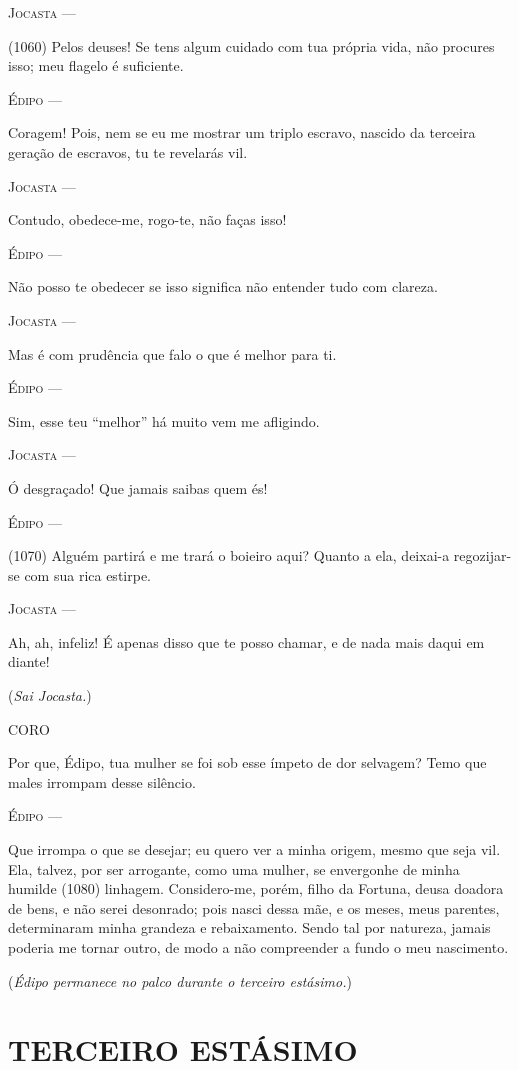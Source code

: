 \textsc{Jocasta} ---

(1060) Pelos deuses! Se tens algum cuidado com tua própria vida, não
procures isso; meu flagelo é suficiente.

\textsc{Édipo} ---

Coragem! Pois, nem se eu me mostrar um triplo escravo, nascido da
terceira geração de escravos, tu te revelarás vil.

\textsc{Jocasta} ---

Contudo, obedece-me, rogo-te, não faças isso!

\textsc{Édipo} ---

Não posso te obedecer se isso significa não entender tudo com clareza.

\textsc{Jocasta} ---

Mas é com prudência que falo o que é melhor para ti.

\textsc{Édipo} ---

Sim, esse teu ``melhor'' há muito vem me afligindo.

\textsc{Jocasta} ---

Ó desgraçado! Que jamais saibas quem és!

\textsc{Édipo} ---

(1070) Alguém partirá e me trará o boieiro aqui? Quanto a ela, deixai-a
regozijar-se com sua rica estirpe.

\textsc{Jocasta} ---

Ah, ah, infeliz! É apenas disso que te posso chamar, e de nada mais
daqui em diante!

(\emph{Sai Jocasta.})

\textsc{CORO}

Por que, Édipo, tua mulher se foi sob esse ímpeto de dor selvagem? Temo
que males irrompam desse silêncio.

\textsc{Édipo} ---

Que irrompa o que se desejar; eu quero ver a minha origem, mesmo que
seja vil. Ela, talvez, por ser arrogante, como uma mulher, se envergonhe
de minha humilde (1080) linhagem. Considero-me, porém, filho da Fortuna,
deusa doadora de bens, e não serei desonrado; pois nasci dessa mãe, e os
meses, meus parentes, determinaram minha grandeza e rebaixamento. Sendo
tal por natureza, jamais poderia me tornar outro, de modo a não
compreender a fundo o meu nascimento.

(\emph{Édipo permanece no palco durante o terceiro estásimo.})

\section{TERCEIRO ESTÁSIMO}


